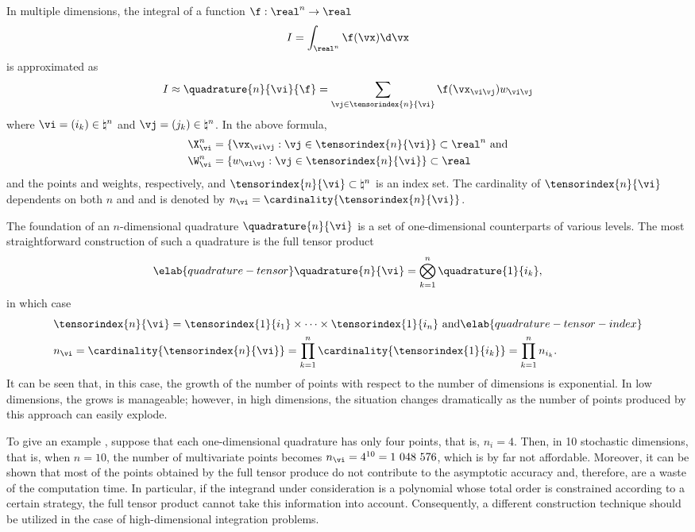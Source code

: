 In multiple dimensions, the integral of a function $\f: \real^n \to \real$
\[
  I = \int_{\real^n} \f(\vx) \d \vx
\]
is approximated as
\[
  I \approx \quadrature{n}{\vi}{\f}
  = \sum_{\vj \in \tensorindex{n}{\vi}} \f(\vx_{\vi \vj}) w_{\vi \vj}
\]
where $\vi = (i_k) \in \natural^n$ and $\vj = (j_k) \in \natural^n$. In the
above formula,
\begin{align*}
  & \X^n_{\vi} = \{ \vx_{\vi \vj}: \vj \in \tensorindex{n}{\vi} \} \subset \real^n \text{ and} \\
  & \W^n_{\vi} = \{ w_{\vi \vj}: \vj \in \tensorindex{n}{\vi} \} \subset \real
\end{align*}
and the points and weights, respectively, and $\tensorindex{n}{\vi} \subset
\natural^n$ is an index set. The cardinality of $\tensorindex{n}{\vi}$
dependents on both $n$ and \vi and is denoted by $n_{\vi} =
\cardinality{\tensorindex{n}{\vi}}$.

The foundation of an $n$-dimensional quadrature $\quadrature{n}{\vi}$ is a set
of one-dimensional counterparts of various levels. The most straightforward
construction of such a quadrature is the full tensor product
\begin{equation} \elab{quadrature-tensor}
  \quadrature{n}{\vi} = \bigotimes_{k = 1}^n \quadrature{1}{i_k},
\end{equation}
in which case
\begin{align}
  & \tensorindex{n}{\vi}
  = \tensorindex{1}{i_1} \times \cdots \times \tensorindex{1}{i_n} \text{ and} \elab{quadrature-tensor-index} \\
  & n_{\vi}
  = \cardinality{\tensorindex{n}{\vi}}
  = \prod_{k = 1}^n \cardinality{\tensorindex{1}{i_k}}
  = \prod_{k = 1}^n n_{i_k}. \nonumber
\end{align}
It can be seen that, in this case, the growth of the number of points with
respect to the number of dimensions is exponential. In low dimensions, the grows
is manageable; however, in high dimensions, the situation changes dramatically
as the number of points produced by this approach can easily explode.

To give an example \cite{heiss2008}, suppose that each one-dimensional
quadrature has only four points, that is, $n_i = 4$. Then, in 10 stochastic
dimensions, that is, when $n = 10$, the number of multivariate points becomes
$n_{\vi} = 4^{10} = 1~048~576$, which is by far not affordable. Moreover, it can
be shown that most of the points obtained by the full tensor produce do not
contribute to the asymptotic accuracy and, therefore, are a waste of the
computation time. In particular, if the integrand under consideration is a
polynomial whose total order is constrained according to a certain strategy, the
full tensor product cannot take this information into account. Consequently, a
different construction technique should be utilized in the case of
high-dimensional integration problems.

